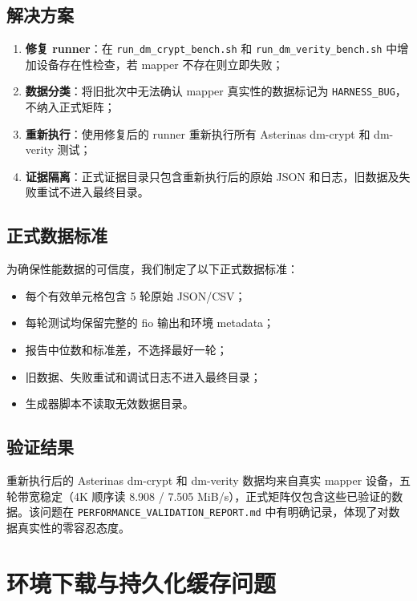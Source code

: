 \subsection{解决方案}

\begin{enumerate}
    \item \textbf{修复 runner}：在 \texttt{run\_dm\_crypt\_bench.sh} 和 \texttt{run\_dm\_verity\_bench.sh} 中增加设备存在性检查，若 mapper 不存在则立即失败；
    \item \textbf{数据分类}：将旧批次中无法确认 mapper 真实性的数据标记为 \texttt{HARNESS\_BUG}，不纳入正式矩阵；
    \item \textbf{重新执行}：使用修复后的 runner 重新执行所有 Asterinas dm-crypt 和 dm-verity 测试；
    \item \textbf{证据隔离}：正式证据目录只包含重新执行后的原始 JSON 和日志，旧数据及失败重试不进入最终目录。
\end{enumerate}

\subsection{正式数据标准}

为确保性能数据的可信度，我们制定了以下正式数据标准：
\begin{itemize}
    \item 每个有效单元格包含 5 轮原始 JSON/CSV；
    \item 每轮测试均保留完整的 fio 输出和环境 metadata；
    \item 报告中位数和标准差，不选择最好一轮；
    \item 旧数据、失败重试和调试日志不进入最终目录；
    \item 生成器脚本不读取无效数据目录。
\end{itemize}

\subsection{验证结果}

重新执行后的 Asterinas dm-crypt 和 dm-verity 数据均来自真实 mapper 设备，五轮带宽稳定（4K 顺序读 8.908 / 7.505 MiB/s），正式矩阵仅包含这些已验证的数据。该问题在 \texttt{PERFORMANCE\_VALIDATION\_REPORT.md} 中有明确记录，体现了对数据真实性的零容忍态度。

\section{环境下载与持久化缓存问题}

